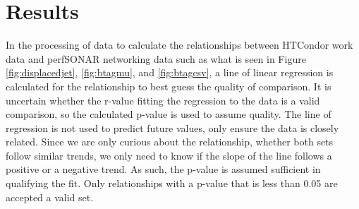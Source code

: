 \documentclass[sigconf]{acmart}
\begin{document}
\section{Results}
In the processing of data to calculate the relationships between HTCondor work data and perfSONAR networking data such as what is seen in Figure \ref{fig:displacedjet}, \ref{fig:btagmu}, and \ref{fig:btagcsv}, a line of linear regression is calculated for the relationship to best guess the quality of comparison. It is uncertain whether the r-value fitting the regression to the data is a valid comparison, so the calculated p-value is used to assume quality. The line of regression is not used to predict future values, only ensure the data is closely related. Since we are only curious about the relationship, whether both sets follow similar trends, we only need to know if the slope of the line follows a positive or a negative trend. As such, the p-value is assumed sufficient in qualifying the fit. Only relationships with a p-value that is less than 0.05 are accepted a valid set.
\end{document}
